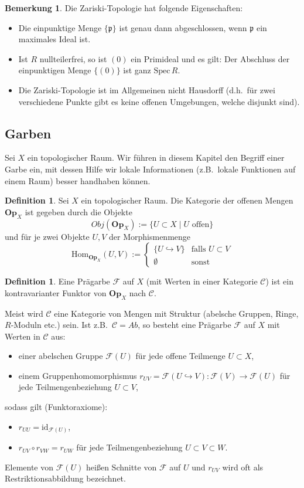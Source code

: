 \documentclass[reqno,12pt]{article}
\numberwithin{equation}{section}
\newcommand{\cC}{\mathcal{C}}
\newcommand{\Spec}{\text{Spec}\,}
\newcommand{\id}{\text{id}}
\theoremstyle{plain}
\theoremstyle{definition}
\newtheorem{definition}[thm]{Definition}
\newtheorem{remark}[thm]{Bemerkung}
\begin{document}
\begin{remark}
	Die Zariski-Topologie hat folgende Eigenschaften:
\begin{itemize}
	\item Die einpunktige Menge $\{ \mathfrak{p} \}$ ist genau dann abgeschlossen, wenn $\mathfrak{p}$ ein maximales Ideal ist.
	\item Ist $R$ nullteilerfrei, so ist $(0)$ ein Primideal und es gilt: Der Abschluss der einpunktigen Menge $\{(0)\}$ ist ganz $\Spec R$.
	\item Die Zariski-Topologie ist im Allgemeinen nicht Hausdorff (d.h.\ für zwei verschiedene Punkte gibt es keine offenen Umgebungen, welche disjunkt sind).
\end{itemize}
\end{remark}

\subsection{Garben}

Sei $X$ ein topologischer Raum. Wir führen in diesem Kapitel den Begriff einer Garbe ein, mit dessen Hilfe wir lokale Informationen (z.B.\ lokale Funktionen auf einem Raum) besser handhaben können.

\begin{definition}
Sei $X$ ein topologischer Raum. Die {\sf Kategorie der offenen Mengen} $\mathbf{Op}_X$ ist gegeben durch die Objekte
$$Obj(\mathbf{Op}_X):=\{ U\subset X\mid U \text{ offen} \}$$
und für je zwei Objekte $U,V$ der Morphismenmenge
$$\mathrm{Hom}_{\mathbf{Op}_X}(U,V):=\begin{cases}
\{U\hookrightarrow V\}& \text{falls $U\subset V$}\\
\emptyset &\text{sonst}
\end{cases}$$
\end{definition}

\begin{definition}
Eine {\sf Prägarbe} $\mathcal{F}$ auf $X$ (mit Werten in einer Kategorie $\cC$) ist ein kontravarianter Funktor von $\mathbf{Op}_X$ nach $\cC$.
\end{definition}
Meist wird $\cC$ eine Kategorie von Mengen mit Struktur (abelsche Gruppen, Ringe, $R$-Moduln etc.) sein. Ist z.B.\ $\cC=\mathit{Ab}$, so besteht eine Prägarbe $\mathcal{F}$ auf $X$ mit Werten in $\cC$ aus:
\begin{itemize}
	\item einer abelschen Gruppe $\mathcal{F}(U)$ für jede offene Teilmenge $U\subset X$,
	\item einem Gruppenhomomorphismus $r_{UV}=\mathcal{F}(U\hookrightarrow V)\colon \mathcal{F}(V)\to \mathcal{F}(U)$
	für jede Teilmengenbeziehung $U\subset V$,
\end{itemize}
sodass gilt (Funktoraxiome):
\begin{itemize}
	\item $r_{UU}=\id_{\mathcal{F}(U)}$,
	\item $r_{UV}\circ r_{VW}=r_{UW}$ für jede Teilmengenbeziehung $U\subset V\subset W$.
\end{itemize}
Elemente von $\mathcal{F}(U)$ heißen {\sf Schnitte} von $\mathcal{F}$ auf $U$ und $r_{UV}$ wird oft als {\sf Restriktionsabbildung} bezeichnet.
\end{document}
